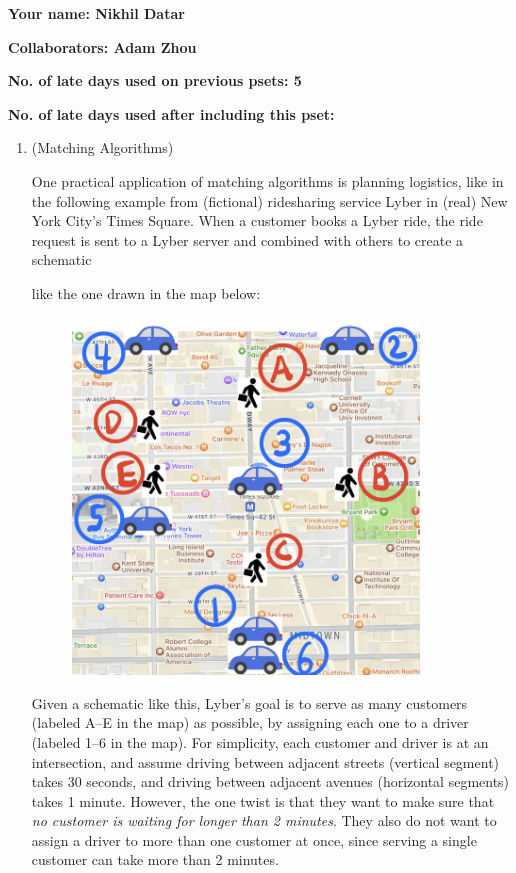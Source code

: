 \documentclass[11pt]{article}
\begin{document}

\textbf{Your name: Nikhil Datar}

\textbf{Collaborators: Adam Zhou}

\textbf{No. of late days used on previous psets: 5}

\textbf{No. of late days used after including this pset: }

\begin{enumerate}
 \item (Matching Algorithms) 

 One practical application of matching algorithms is planning logistics, like in the following example from (fictional) ridesharing service Lyber in (real) New York City's Times Square.  When a customer books a Lyber ride, the ride request is sent to a Lyber server and combined with others to create a schematic 

 like the one drawn in the map below:


\begin{figure}[H]
    \centering
    \includegraphics[width=0.87\textwidth]{NYC-map-zoomed-light.jpeg}
    \label{fig:travel_time_graph}
\end{figure}

Given a schematic like this, Lyber's goal is to serve as many customers (labeled A--E in the map) as possible, by assigning each one to a driver (labeled 1--6 in the map). For simplicity, each customer and driver is at an intersection, and assume driving between adjacent streets (vertical segment) takes 30 seconds, and driving between adjacent avenues (horizontal segments) takes 1 minute. However, the one twist is that they want to make sure that \textit{no customer is waiting for longer than 2 minutes}.  They also do not want to assign a driver to more than one customer at once, since serving a single customer can take more than 2 minutes.


\end{enumerate}
\end{document}
